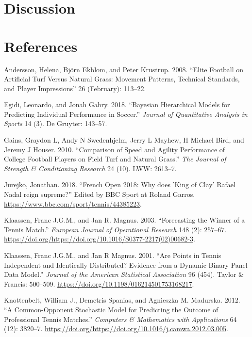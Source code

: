 \documentclass[]{article}
\begin{document}
\hypertarget{sec:discussion}{%
\section{Discussion}\label{sec:discussion}}

\hypertarget{sec:refs}{%
\section{References}\label{sec:refs}}

\footnotesize

\hypertarget{refs}{}
\leavevmode\hypertarget{ref-andersson2008}{}%
Andersson, Helena, Björn Ekblom, and Peter Krustrup. 2008. ``Elite
Football on Artificial Turf Versus Natural Grass: Movement Patterns,
Technical Standards, and Player Impressions'' 26 (February): 113--22.

\leavevmode\hypertarget{ref-egidi2018}{}%
Egidi, Leonardo, and Jonah Gabry. 2018. ``Bayesian Hierarchical Models
for Predicting Individual Performance in Soccer.'' \emph{Journal of
Quantitative Analysis in Sports} 14 (3). De Gruyter: 143--57.

\leavevmode\hypertarget{ref-gains2010}{}%
Gains, Graydon L, Andy N Swedenhjelm, Jerry L Mayhew, H Michael Bird,
and Jeremy J Houser. 2010. ``Comparison of Speed and Agility Performance
of College Football Players on Field Turf and Natural Grass.'' \emph{The
Journal of Strength \& Conditioning Research} 24 (10). LWW: 2613--7.

\leavevmode\hypertarget{ref-bbc2018}{}%
Jurejko, Jonathan. 2018. ``French Open 2018: Why does 'King of Clay'
Rafael Nadal reign supreme?'' Edited by BBC Sport at Roland Garros.
\url{https://www.bbc.com/sport/tennis/44385223}.

\leavevmode\hypertarget{ref-klaassen2003}{}%
Klaassen, Franc J.G.M., and Jan R. Magnus. 2003. ``Forecasting the
Winner of a Tennis Match.'' \emph{European Journal of Operational
Research} 148 (2): 257--67.
\url{https://doi.org/https://doi.org/10.1016/S0377-2217(02)00682-3}.

\leavevmode\hypertarget{ref-klaassen2001}{}%
Klaassen, Franc J.G.M., and Jan R Magnus. 2001. ``Are Points in Tennis
Independent and Identically Distributed? Evidence from a Dynamic Binary
Panel Data Model.'' \emph{Journal of the American Statistical
Association} 96 (454). Taylor \& Francis: 500--509.
\url{https://doi.org/10.1198/016214501753168217}.

\leavevmode\hypertarget{ref-knottenbelt2012}{}%
Knottenbelt, William J., Demetris Spanias, and Agnieszka M. Madurska.
2012. ``A Common-Opponent Stochastic Model for Predicting the Outcome of
Professional Tennis Matches.'' \emph{Computers \& Mathematics with
Applications} 64 (12): 3820--7.
\url{https://doi.org/https://doi.org/10.1016/j.camwa.2012.03.005}.
\end{document}
